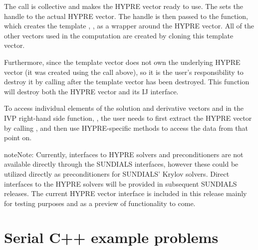 \documentclass[letterpaper,10pt,english]{sphinxmanual}
\begin{document}
The  call is collective and makes the HYPRE vector ready to
use.  The sets the handle  to the actual HYPRE vector.  The
handle is then passed to the  function, which creates the
template , , as a wrapper around the HYPRE vector.
All of the other vectors used in the computation are created by
cloning this template vector.

Furthermore, since the template vector does not own the underlying
HYPRE vector (it was created using the  call
above), so it is the user’s responsibility to destroy it by calling
 after the template vector  has
been destroyed.  This function will destroy both the HYPRE vector
and its IJ interface.

To access individual elements of the solution and derivative vectors
 and  in the IVP right-hand side function, , the
user needs to first extract the HYPRE vector by calling
, and then use HYPRE-specific methods to access
the data from that point on.

\begin{sphinxadmonition}{note}{Note:}
Currently, interfaces to HYPRE solvers and preconditioners are not
available directly through the SUNDIALS interfaces, however these
could be utilized directly as preconditioners for SUNDIALS’ Krylov
solvers.  Direct interfaces to the HYPRE solvers will be provided
in subsequent SUNDIALS releases.  The current HYPRE vector
interface is included in this release mainly for testing purposes
and as a preview of functionality to come.
\end{sphinxadmonition}


\chapter{Serial C++ example problems}
\label{\detokenize{cpp_serial:serial-c-example-problems}}\label{\detokenize{cpp_serial::doc}}\label{\detokenize{cpp_serial:serial-cpp}}
\end{document}
